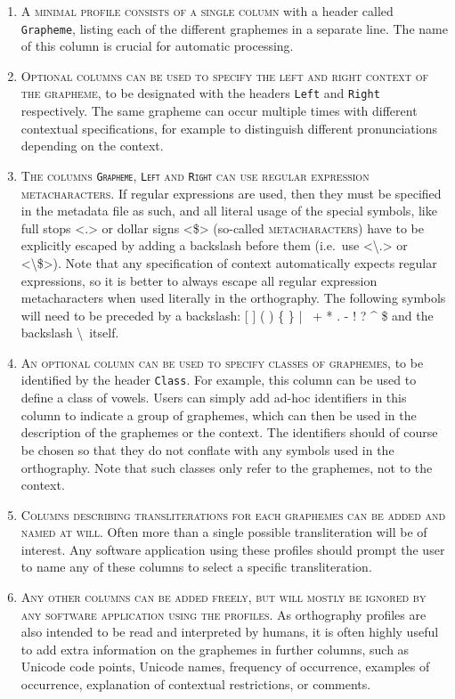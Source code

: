 \begin{enumerate}
	\def\labelenumi{A\arabic{enumi}.} \setcounter{enumi}{4} 
	\item \textsc{A minimal profile consists of a single column} with a header
       called \texttt{Grapheme}, listing each of the different graphemes in a
       separate line. The name of this column is crucial for automatic 
       processing.
	\item \textsc{Optional columns can be used to specify the left and right
       context of the grapheme}, to be designated with the headers \texttt{Left}
       and \texttt{Right} respectively. The same grapheme can occur multiple
       times with different contextual specifications, for example to
       distinguish different pronunciations depending on the context. 
	\item \textsc{The columns \texttt{Grapheme}, \texttt{Left} and \texttt{Right}
       can use regular expression metacharacters.} If regular expressions are
       used, then they must be specified in the metadata file as such, 
	   and all literal usage of the special symbols, like full stops <.>
       or dollar signs <\$> (so-called \textsc{metacharacters}) have to be
       explicitly escaped by adding a backslash before them (i.e.~use
       <\textbackslash.> or <\textbackslash\$>). Note that any specification of
       context automatically expects regular expressions, so it is 
       better to always escape all regular expression metacharacters when used
       literally in the orthography. The following symbols will need to be
       preceded by a backslash: {[} {]} ( ) \{ \} | ~+ * . - ! ? \^{} \$ and the
       backslash \textbackslash~itself. 
	\item \textsc{An optional column can be used to specify classes of graphemes},
       to be identified by the header \texttt{Class}. For example, this column
       can be used to define a class of vowels. Users can simply add ad-hoc
       identifiers in this column to indicate a group of graphemes, which can
       then be used in the description of the graphemes or the context. The
       identifiers should of course be chosen so that they do not conflate
       with any symbols used in the orthography. Note that such
       classes only refer to the graphemes, not to the context. 
	\item \textsc{Columns describing transliterations for each graphemes can be
       added and named at will}. Often more than a single possible
       transliteration will be of interest. Any software application using these
       profiles should prompt the user to name any of these columns to select a
       specific transliteration. 
	\item \textsc{Any other columns can be added freely, but will mostly be ignored
       by any software application using the profiles}. As orthography profiles
       are also intended to be read and interpreted by humans, it is often
       highly useful to add extra information on the graphemes in further
       columns, such as Unicode code points, Unicode names, frequency of
       occurrence, examples of occurrence, explanation of contextual
       restrictions, or comments. 
 \end{enumerate}

